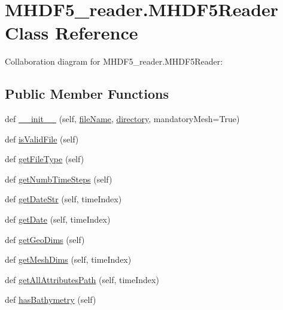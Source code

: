 \hypertarget{class_m_h_d_f5__reader_1_1_m_h_d_f5_reader}{}\section{M\+H\+D\+F5\+\_\+reader.\+M\+H\+D\+F5\+Reader Class Reference}
\label{class_m_h_d_f5__reader_1_1_m_h_d_f5_reader}


Collaboration diagram for M\+H\+D\+F5\+\_\+reader.\+M\+H\+D\+F5\+Reader\+:
\subsection*{Public Member Functions}
\begin{DoxyCompactItemize}
\item 
def \mbox{\hyperlink{class_m_h_d_f5__reader_1_1_m_h_d_f5_reader_a11826c8a3513ad304efedf7a63ceb992}{\+\_\+\+\_\+init\+\_\+\+\_\+}} (self, \mbox{\hyperlink{class_m_h_d_f5__reader_1_1_m_h_d_f5_reader_acfb0f212ab6190056926277fbc215ff4}{file\+Name}}, \mbox{\hyperlink{class_m_h_d_f5__reader_1_1_m_h_d_f5_reader_abb791fb16427504bfe7dfa73204747e9}{directory}}, mandatory\+Mesh=True)
\item 
def \mbox{\hyperlink{class_m_h_d_f5__reader_1_1_m_h_d_f5_reader_a6f95078ac94bea3283223688091854d5}{is\+Valid\+File}} (self)
\item 
def \mbox{\hyperlink{class_m_h_d_f5__reader_1_1_m_h_d_f5_reader_af878d42810452ebceffe648bd04970d1}{get\+File\+Type}} (self)
\item 
def \mbox{\hyperlink{class_m_h_d_f5__reader_1_1_m_h_d_f5_reader_a5ba881e026e00f66ea31d212dd0be87b}{get\+Numb\+Time\+Steps}} (self)
\item 
def \mbox{\hyperlink{class_m_h_d_f5__reader_1_1_m_h_d_f5_reader_a81ca43bbc8a077b4daf07e07bba3e31d}{get\+Date\+Str}} (self, time\+Index)
\item 
def \mbox{\hyperlink{class_m_h_d_f5__reader_1_1_m_h_d_f5_reader_a0c16ad2e43bb3171cfec1b227e042218}{get\+Date}} (self, time\+Index)
\item 
def \mbox{\hyperlink{class_m_h_d_f5__reader_1_1_m_h_d_f5_reader_aa433954c98bbb5384bbd25e523ca1925}{get\+Geo\+Dims}} (self)
\item 
def \mbox{\hyperlink{class_m_h_d_f5__reader_1_1_m_h_d_f5_reader_aa80431c3897dbff8479ebcdde1676e26}{get\+Mesh\+Dims}} (self, time\+Index)
\item 
def \mbox{\hyperlink{class_m_h_d_f5__reader_1_1_m_h_d_f5_reader_ac1ab22571dbffbce200aec34fd658dc5}{get\+All\+Attributes\+Path}} (self, time\+Index)
\item 
def \mbox{\hyperlink{class_m_h_d_f5__reader_1_1_m_h_d_f5_reader_a7e1fc985528e18756f46dd9d31bc6530}{has\+Bathymetry}} (self)
\end{DoxyCompactItemize}
